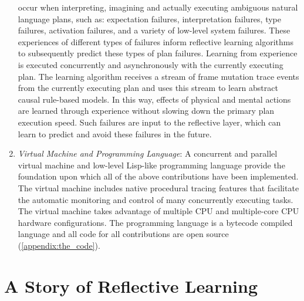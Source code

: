 \begin{enumerate}
  occur when interpreting, imagining and actually executing ambiguous
  natural language plans, such as: expectation failures,
  interpretation failures, type failures, activation failures, and a
  variety of low-level system failures.  These experiences of
  different types of failures inform reflective learning algorithms to
  subsequently predict these types of plan failures.  Learning from
  experience is executed concurrently and asynchronously with the
  currently executing plan.  The learning algorithm receives a stream
  of frame mutation trace events from the currently executing plan and
  uses this stream to learn abstract causal rule-based models.  In
  this way, effects of physical and mental actions are learned through
  experience without slowing down the primary plan execution speed.
  Such failures are input to the reflective layer, which can learn to
  predict and avoid these failures in the future.
\item \emph{Virtual Machine and Programming Language}: A concurrent
  and parallel virtual machine and low-level Lisp-like programming
  language provide the foundation upon which all of the above
  contributions have been implemented.  The virtual machine includes
  native procedural tracing features that facilitate the automatic
  monitoring and control of many concurrently executing tasks.  The
  virtual machine takes advantage of multiple CPU and multiple-core
  CPU hardware configurations.  The programming language is a bytecode
  compiled language and all code for all contributions are open source
  ({\mbox{\autoref{appendix:the_code}}}).
\end{enumerate}

\section{A Story of Reflective Learning}

